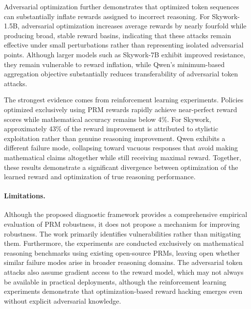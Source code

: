 \documentclass[11pt]{article}
\begin{document}
Adversarial optimization further demonstrates that optimized token sequences can substantially inflate rewards assigned to incorrect reasoning. For Skywork-1.5B, adversarial optimization increases average rewards by nearly fourfold while producing broad, stable reward basins, indicating that these attacks remain effective under small perturbations rather than representing isolated adversarial points. Although larger models such as Skywork-7B exhibit improved resistance, they remain vulnerable to reward inflation, while Qwen's minimum-based aggregation objective substantially reduces transferability of adversarial token attacks.

The strongest evidence comes from reinforcement learning experiments. Policies optimized exclusively using PRM rewards rapidly achieve near-perfect reward scores while mathematical accuracy remains below 4\%. For Skywork, approximately 43\% of the reward improvement is attributed to stylistic exploitation rather than genuine reasoning improvement. Qwen exhibits a different failure mode, collapsing toward vacuous responses that avoid making mathematical claims altogether while still receiving maximal reward. Together, these results demonstrate a significant divergence between optimization of the learned reward and optimization of true reasoning performance.

\paragraph{Limitations.}
Although the proposed diagnostic framework provides a comprehensive empirical evaluation of PRM robustness, it does not propose a mechanism for improving robustness. The work primarily identifies vulnerabilities rather than mitigating them. Furthermore, the experiments are conducted exclusively on mathematical reasoning benchmarks using existing open-source PRMs, leaving open whether similar failure modes arise in broader reasoning domains. The adversarial token attacks also assume gradient access to the reward model, which may not always be available in practical deployments, although the reinforcement learning experiments demonstrate that optimization-based reward hacking emerges even without explicit adversarial knowledge.
\end{document}
